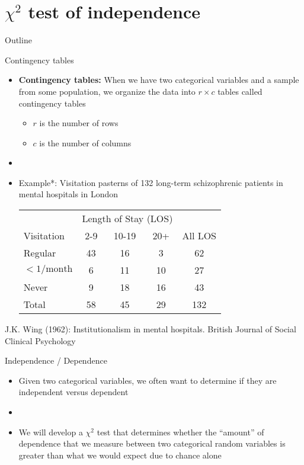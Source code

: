 \documentclass[xcolor=dvipsnames]{beamer}
\begin{document}
\section{$\chi^2$ test of independence}
\begin{frame}{Outline}
\tableofcontents[currentsection,subsectionstyle=show/shaded/hide]
\end{frame}

\begin{frame}{Contingency tables}
	\begin{itemize}
		\item \textbf{Contingency tables:} When we have two categorical variables and a sample from some population, we organize the data into $r\times c$ tables called contingency tables
		\begin{itemize}
			\item $r$ is the number of rows
			\item $c$ is the number of columns
		\end{itemize}
		\item[]
		\item Example*: Visitation pasterns of 132 long-term schizophrenic patients in mental hospitals in London
		\begin{center}
			\begin{tabular}{|l|ccc|c|}
				\hline
				& \multicolumn{3}{c|}{Length of Stay (LOS)} & \\
				Visitation & 2-9 & 10-19 & 20+ & All LOS \\ \hline
				Regular & 43 & 16 & 3 & 62\\ 
				$<1/\text{month}$ & 6 & 11 & 10 & 27 \\
				Never & 9 & 18 & 16 & 43\\ \hline
				Total & 58 & 45 & 29 & 132\\ \hline
			\end{tabular}
		\end{center}
	\end{itemize}
{\tiny *J.K. Wing (1962): Institutionalism in mental hospitals. British Journal of Social Clinical Psychology}
\end{frame}

\begin{frame}{Independence / Dependence}
	\begin{itemize}
		\item Given two categorical variables, we often want to determine if they are independent versus dependent
		\item[]
		\item We will develop a $\chi^2$ test that determines whether the ``amount'' of dependence that we measure between two categorical random variables is greater than what we would expect due to chance alone 
	\end{itemize}
\end{frame}
\end{document}
